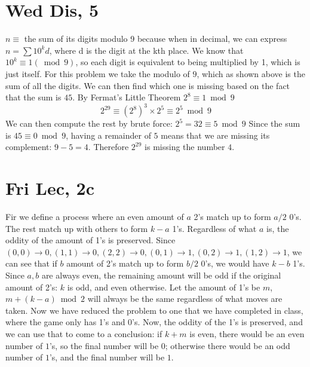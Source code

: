 \documentclass[12pt]{article}
\begin{document}
\section{Wed Dis, 5}
$n \equiv$ the sum of its digits modulo 9 because when in decimal, we can express $n = \sum 10^kd$, where d is the digit at the kth place. We know that $10^k \equiv 1(\bmod 9)$, so each digit is equivalent to being multiplied by 1, which is just itself.
\newline
For this problem we take the modulo of $9$, which as shown above is the sum of all the digits. We can then find which one is missing based on the fact that the sum is $45$.
\newline
By Fermat's Little Theorem $2^8 \equiv 1 \bmod 9$
$$2^29 \equiv (2^{8})^3 \times 2^5 \equiv 2^5 \bmod 9$$
We can then compute the rest by brute force: $2^5 = 32 \equiv 5 \bmod 9$
\newline
Since the sum is $45 \equiv 0 \bmod 9$, having a remainder of $5$ means that we are missing its complement: $9-5=4$.
\newline
Therefore $2^29$ is missing the number $4$.
\newpage


\section{Fri Lec, 2c}
Fir we define a process where an even amount of $a$ 2's match up to form $a/2$ 0's. The rest match up with others to form $k-a$ 1's. Regardless of what $a$ is, the oddity of the amount of 1's is preserved. Since $(0,0)\to 0, (1,1)\to 0, (2,2)\to 0, (0,1) \to 1, (0,2)\to 1, (1,2)\to 1$, we can see that if $b$ amount of 2's match up to form $b/2$ 0's, we would have $k-b$ 1's.
\newline
Since $a,b$ are always even, the remaining amount will be odd if the original amount of 2's: $k$ is odd, and even otherwise. Let the amount of 1's be $m$, $m+(k-a) \bmod 2$ will always be the same regardless of what moves are taken.
\newline
Now we have reduced the problem to one that we have completed in class, where the game only has 1's and 0's. Now, the oddity of the 1's is preserved, and we can use that to come to a conclusion: if $k+m$ is even, there would be an even number of $1$'s, so the final number will be $0$; otherwise there would be an odd number of $1$'s, and the final number will be $1$.
\end{document}
